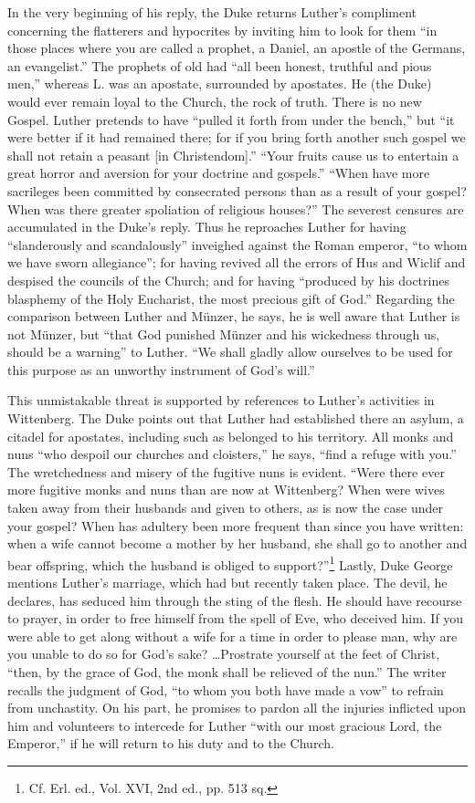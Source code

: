 In the very beginning of his reply, the Duke returns Luther’s compliment
concerning the flatterers and hypocrites by inviting him to look for them “in
those places where you are called a prophet, a Daniel, an apostle of the
Germans, an evangelist.” The prophets of old had “all been honest, truthful
and pious men,” whereas L. was an apostate, surrounded by apostates. He
(the Duke) would ever remain loyal to the Church, the rock of truth.
There is no new Gospel. Luther pretends to have “pulled it forth from under
the bench,” but “it were better if it had remained there; for if you bring
forth another such gospel we shall not retain a peasant [in Christendom].”
“Your fruits cause us to entertain a great horror and aversion for your
doctrine and gospels.” “When have more sacrileges been committed by consecrated
persons than as a result of your gospel? When was there greater
spoliation of religious houses?” The severest censures are accumulated in the
Duke’s reply. Thus he reproaches Luther for having ``slanderously and
scandalously'' inveighed against the Roman emperor, “to whom we have
sworn allegiance”; for having revived all the errors of Hus and Wiclif and
despised the councils of the Church; and for having “produced by his doctrines
blasphemy of the Holy Eucharist, the most precious gift of
God.” Regarding the comparison between Luther and Münzer, he says, he
is well aware that Luther is not Münzer, but “that God punished Münzer
and his wickedness through us, should be a warning” to Luther. “We shall
gladly allow ourselves to be used for this purpose as an unworthy instrument
of God’s will.”

This unmistakable threat is supported by references to Luther’s activities
in Wittenberg. The Duke points out that Luther had established there an
asylum, a citadel for apostates, including such as belonged to his territory.
All monks and nuns “who despoil our churches and cloisters,” he says, “find
a refuge with you.” The wretchedness and misery of the fugitive nuns is
evident. “Were there ever more fugitive monks and nuns than are now at
Wittenberg? When were wives taken away from their husbands and given
to others, as is now the case under your gospel? When has adultery been
more frequent than since you have written: when a wife cannot become a
mother by her husband, she shall go to another and bear offspring, which the
husband is obliged to support?”\footnote{Cf. Erl. ed., Vol. XVI, 2nd ed., pp. 513 sq.}
Lastly, Duke George mentions Luther’s
marriage, which had but recently taken place. The devil, he declares, has
seduced him through the sting of the flesh. He should have recourse to prayer,
in order to free himself from the spell of Eve, who deceived him. If you
were able to get along without a wife for a time in order to please man,
why are you unable to do so for God’s sake? \dots Prostrate yourself at the
feet of Christ, “then, by the grace of God, the monk shall be relieved of the
nun.” The writer recalls the judgment of God, “to whom you both have
made a vow” to refrain from unchastity. On his part, he promises to pardon
all the injuries inflicted upon him and volunteers to intercede for Luther
“with our most gracious Lord, the Emperor,” if he will return to his duty
and to the Church.
